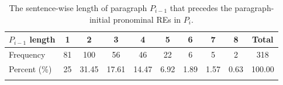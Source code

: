 \begin{table}[ht]
\centering
\begin{tabular}{lccccccccc}
  \lsptoprule
$P_{i-1}$ length & 1 & 2 & 3 & 4 & 5 & 6 & 7 & 8 & Total \\ 
  \midrule
Frequency &  81 & 100 & 56 & 46 & 22 & 6 & 5 & 2 & 318 \\ 
  Percent (\%) &  25 & 31.45 & 17.61 & 14.47 & 6.92 & 1.89 & 1.57 & 0.63 & 100.00 \\ 
   \lspbottomrule
\end{tabular}
\caption[The sentence-wise length of paragraph $P_{i-1}$.]{The sentence-wise length of paragraph $P_{i-1}$ that precedes the paragraph-initial pronominal REs in $P_{i}$.}
\label{tab:firstrefpron}
\end{table}
